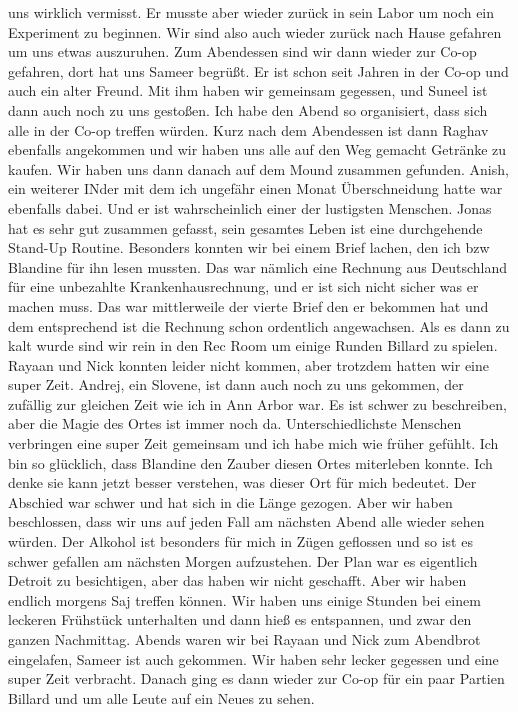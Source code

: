 \documentclass[11pt]{book}
\begin{document}
uns wirklich vermisst. Er musste aber wieder zurück in sein Labor um noch ein Experiment zu beginnen. Wir sind also auch wieder zurück nach Hause gefahren 
um uns etwas auszuruhen. Zum Abendessen sind wir dann wieder zur Co-op gefahren, dort hat uns Sameer begrüßt. Er ist schon seit Jahren in der Co-op und auch ein 
alter Freund. Mit ihm haben wir gemeinsam gegessen, und Suneel ist dann auch noch zu uns gestoßen. Ich habe den Abend so organisiert, dass sich alle in der Co-op 
treffen würden. Kurz nach dem Abendessen ist dann Raghav ebenfalls angekommen und wir haben uns alle auf den Weg gemacht Getränke zu kaufen. Wir haben uns 
dann danach auf dem Mound zusammen gefunden. Anish, ein weiterer INder mit dem ich ungefähr einen Monat Überschneidung hatte war ebenfalls dabei. Und er ist 
wahrscheinlich einer der lustigsten Menschen. Jonas hat es sehr gut zusammen gefasst, sein gesamtes Leben ist eine durchgehende Stand-Up Routine. Besonders konnten 
wir bei einem Brief lachen, den ich bzw Blandine für ihn lesen mussten. Das war nämlich eine Rechnung aus Deutschland für eine unbezahlte Krankenhausrechnung, und 
er ist sich nicht sicher was er machen muss. Das war mittlerweile der vierte Brief den er bekommen hat und dem entsprechend ist die Rechnung schon ordentlich 
angewachsen. Als es dann zu kalt wurde sind wir rein in den Rec Room um einige Runden Billard zu spielen. Rayaan und Nick konnten leider nicht kommen, aber trotzdem hatten 
wir eine super Zeit. Andrej, ein Slovene, ist dann auch noch zu uns gekommen, der zufällig zur gleichen Zeit wie ich in Ann Arbor war. Es ist schwer zu beschreiben, 
aber die Magie des Ortes ist immer noch da. Unterschiedlichste Menschen verbringen eine super Zeit gemeinsam und ich habe mich wie früher gefühlt. Ich bin 
so glücklich, dass Blandine den Zauber diesen Ortes miterleben konnte. Ich denke sie kann jetzt besser verstehen, was dieser Ort für mich bedeutet. Der Abschied 
war schwer und hat sich in die Länge gezogen. Aber wir haben beschlossen, dass wir uns auf jeden Fall am nächsten Abend alle wieder sehen würden. Der Alkohol 
ist besonders für mich in Zügen geflossen und so ist es schwer gefallen am nächsten Morgen aufzustehen. Der Plan war es eigentlich Detroit zu besichtigen, aber das haben 
wir nicht geschafft. Aber wir haben endlich morgens Saj treffen können. Wir haben uns einige Stunden bei einem leckeren Frühstück unterhalten und dann 
hieß es entspannen, und zwar den ganzen Nachmittag. Abends waren wir bei Rayaan und Nick zum Abendbrot eingelafen, Sameer ist auch gekommen. Wir haben sehr 
lecker gegessen und eine super Zeit verbracht. Danach ging es dann wieder zur Co-op für ein paar Partien Billard und um alle Leute auf ein Neues zu sehen. 
\end{document}
